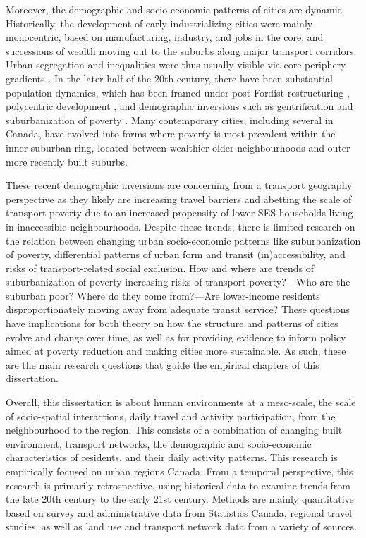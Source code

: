 Moreover, the demographic and socio-economic patterns of cities are dynamic. Historically, the development of early industrializing cities were mainly monocentric, based on manufacturing, industry, and jobs in the core, and successions of wealth moving out to the suburbs along major transport corridors. Urban segregation and inequalities were thus usually visible via core-periphery gradients \cite{burgess_growth_1925,alonso_location_1964,glaeser_sprawl_2004}. In the later half of the 20th century, there have been substantial population dynamics, which has been framed under post-Fordist restructuring \cite{walks_social_2001}, polycentric development \cite{anas_urban_1998}, and demographic inversions \cite{ehrenhalt_great_2012} such as gentrification \cite{vigdor_does_2002} and suburbanization of poverty \cite{ades_are_2012}. Many contemporary cities, including several in Canada, have evolved into forms where poverty is most prevalent within the inner-suburban ring, located between wealthier older neighbourhoods and outer more recently built suburbs.


These recent demographic inversions are concerning from a transport geography perspective as they likely are increasing travel barriers and abetting the scale of transport poverty due to an increased propensity of lower-SES households living in inaccessible neighbourhoods. Despite these trends, there is limited research on the relation between changing urban socio-economic patterns like suburbanization of poverty, differential patterns of urban form and transit (in)accessibility, and risks of transport-related social exclusion. How and where are trends of suburbanization of poverty increasing risks of transport poverty?---Who are the suburban poor? Where do they come from?---Are lower-income residents disproportionately moving away from adequate transit service? These questions have implications for both theory on how the structure and patterns of cities evolve and change over time, as well as for providing evidence to inform policy aimed at poverty reduction and making cities more sustainable. As such, these are the main research questions that guide the empirical chapters of this dissertation.


Overall, this dissertation is about human environments at a meso-scale, the scale of socio-spatial interactions, daily travel and activity participation, from the neighbourhood to the region. This consists of a combination of changing built environment, transport networks, the demographic and socio-economic characteristics of residents, and their daily activity patterns. This research is empirically focused on urban regions Canada. From a temporal perspective, this research is primarily retrospective, using historical data to examine trends from the late 20th century to the early 21st century. Methods are mainly quantitative based on survey and administrative data from Statistics Canada, regional travel studies, as well as land use and transport network data from a variety of sources. 

